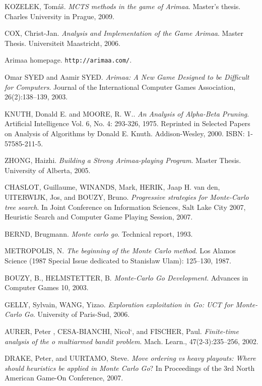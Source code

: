 \def\bibname{Literature}
\begin{thebibliography}{99}
\addcontentsline{toc}{chapter}{\bibname}

	{\sc KOZELEK,} Tomáš.
	\emph{MCTS methods in the game of Arimaa}.
	Master's thesis.
	Charles University in Prague, 2009.

	{\sc COX,} Christ-Jan.
	\emph{Analysis and Implementation of the Game Arimaa}.
	Master Thesis.
	Universiteit Maastricht, 2006.

	Arimaa homepage.
	\texttt{http://arimaa.com/}.

	Omar {\sc SYED} and Aamir {\sc SYED}.
	\emph{Arimaa: A New Game Designed to be Difficult for Computers}.
	Journal of the International Computer Games Association, 26(2):138–139, 2003.

	{\sc KNUTH,} Donald E. and {\sc MOORE,} R. W..
	\emph{An Analysis of Alpha-Beta Pruning}.
	Artificial Intelligence Vol. 6, No. 4: 293-326, 1975. Reprinted in Selected
	Papers on Analysis of Algorithms by Donald E. Knuth. Addison-Wesley, 2000.
	ISBN: 1-57585-211-5.

	{\sc ZHONG,} Haizhi.
	\emph{Building a Strong Arimaa-playing Program}.
	Master Thesis.
	University of Alberta, 2005.

	{\sc CHASLOT,} Guillaume, {\sc WINANDS,} Mark, {\sc HERIK,} Jaap H. van den,
	{\sc UITERWIJK,} Jos, and {\sc BOUZY,} Bruno.
	\emph{Progressive strategies for Monte-Carlo tree search}.
	In Joint Conference on Information Sciences, Salt Lake City 2007, Heuristic
	Search and Computer Game Playing Session, 2007.

	{\sc BERND,} Brugmann.
	\emph{Monte carlo go}.
	Technical report, 1993.

	{\sc METROPOLIS,} N.
	\emph{The beginning of the Monte Carlo method}.
	Los Alamos Science (1987 Special Issue dedicated to Stanisław Ulam):
	125–130, 1987.

	{\sc BOUZY,} B., {\sc HELMSTETTER,} B.
	\emph{Monte-Carlo Go Development}.
	Advances in Computer Games 10, 2003.

	{\sc GELLY,} Sylvain, {\sc WANG,} Yizao.
	\emph{Exploration exploitation in Go: UCT for Monte-Carlo Go}.
	University of Paris-Sud, 2006.

	{\sc AURER,} Peter , {\sc CESA-BIANCHI,} Nicol`, and {\sc FISCHER,} Paul.
	\emph{Finite-time analysis of the o multiarmed bandit problem}.
	Mach. Learn., 47(2-3):235–256, 2002.

	{\sc DRAKE,} Peter, and {\sc UURTAMO,} Steve.
	\emph{Move ordering vs heavy playouts: Where should heuristics be applied
	in Monte Carlo Go}?
	In Proceedings of the 3rd North American Game-On Conference, 2007.

\end{thebibliography}

